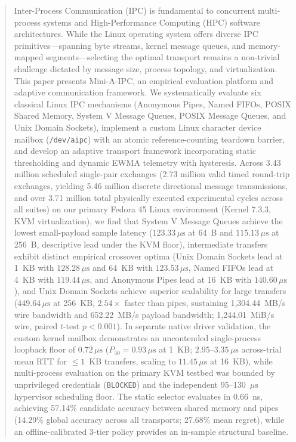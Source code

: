 \documentclass[conference]{IEEEtran}
\begin{document}
\begin{abstract}
Inter-Process Communication (IPC) is fundamental to concurrent multi-process systems and High-Performance Computing (HPC) software architectures. While the Linux operating system offers diverse IPC primitives---spanning byte streams, kernel message queues, and memory-mapped segments---selecting the optimal transport remains a non-trivial challenge dictated by message size, process topology, and virtualization. This paper presents Mini-A-IPC, an empirical evaluation platform and adaptive communication framework. We systematically evaluate six classical Linux IPC mechanisms (Anonymous Pipes, Named FIFOs, POSIX Shared Memory, System V Message Queues, POSIX Message Queues, and Unix Domain Sockets), implement a custom Linux character device mailbox (\texttt{/dev/aipc}) with an atomic reference-counting teardown barrier, and develop an adaptive transport framework incorporating static thresholding and dynamic EWMA telemetry with hysteresis. Across 3.43 million scheduled single-pair exchanges (2.73 million valid timed round-trip exchanges, yielding 5.46 million discrete directional message transmissions, and over 3.71 million total physically executed experimental cycles across all suites) on our primary Fedora 45 Linux environment (Kernel 7.3.3, KVM virtualization), we find that System V Message Queues achieve the lowest small-payload sample latency ($123.33\,\mu\text{s}$ at 64~B and $115.13\,\mu\text{s}$ at 256~B, descriptive lead under the KVM floor), intermediate transfers exhibit distinct empirical crossover optima (Unix Domain Sockets lead at 1~KB with $128.28\,\mu\text{s}$ and 64~KB with $123.53\,\mu\text{s}$, Named FIFOs lead at 4~KB with $119.44\,\mu\text{s}$, and Anonymous Pipes lead at 16~KB with $140.60\,\mu\text{s}$), and Unix Domain Sockets achieve superior scalability for large transfers ($449.64\,\mu\text{s}$ at 256~KB, $2.54\times$ faster than pipes, sustaining 1,304.44~MB/s wire bandwidth and 652.22~MB/s payload bandwidth; 1,244.01~MiB/s wire, paired $t$-test $p < 0.001$). In separate native driver validation, the custom kernel mailbox demonstrates an uncontended single-process loopback floor of $0.72\,\mu\text{s}$ ($P_{50} = 0.93\,\mu\text{s}$ at 1~KB; $2.95\text{--}3.35\,\mu\text{s}$ across-trial mean RTT for $\le 1$~KB transfers, scaling to $11.45\,\mu\text{s}$ at 16~KB), while multi-process evaluation on the primary KVM testbed was bounded by unprivileged credentials (\texttt{BLOCKED}) and the independent 95--130~$\mu\text{s}$ hypervisor scheduling floor. The static selector evaluates in 0.66~ns, achieving 57.14\% candidate accuracy between shared memory and pipes (14.29\% global accuracy across all transports; 27.68\% mean regret), while an offline-calibrated 3-tier policy provides an in-sample structural baseline.
\end{abstract}
\end{document}
